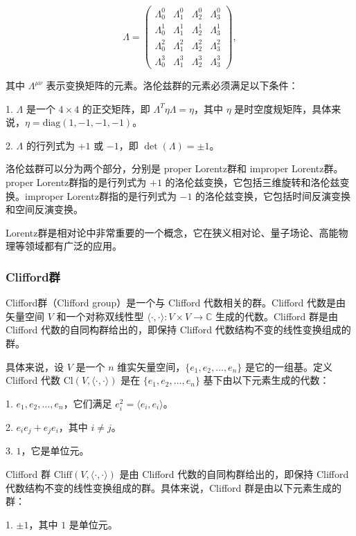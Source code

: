 \documentclass[UTF8,a4paper,11pt]{article}
\begin{document}
$$
\Lambda = \begin{pmatrix} \Lambda^0_0 & \Lambda^0_1 & \Lambda^0_2 & \Lambda^0_3 \\ \Lambda^1_0 & \Lambda^1_1 & \Lambda^1_2 & \Lambda^1_3 \\ \Lambda^2_0 & \Lambda^2_1 & \Lambda^2_2 & \Lambda^2_3 \\ \Lambda^3_0 & \Lambda^3_1 & \Lambda^3_2 & \Lambda^3_3 \end{pmatrix},
$$

其中 $\Lambda^{\mu\nu}$ 表示变换矩阵的元素。洛伦兹群的元素必须满足以下条件：

1. $\Lambda$ 是一个 $4\times4$ 的正交矩阵，即 $\Lambda^T \eta \Lambda = \eta$，其中 $\eta$ 是时空度规矩阵，具体来说，$\eta = \text{diag}(1,-1,-1,-1)$。

2. $\Lambda$ 的行列式为 $+1$ 或 $-1$，即 $\det(\Lambda) = \pm 1$。

洛伦兹群可以分为两个部分，分别是 proper Lorentz群和 improper Lorentz群。proper Lorentz群指的是行列式为 $+1$ 的洛伦兹变换，它包括三维旋转和洛伦兹变换。improper Lorentz群指的是行列式为 $-1$ 的洛伦兹变换，它包括时间反演变换和空间反演变换。

Lorentz群是相对论中非常重要的一个概念，它在狭义相对论、量子场论、高能物理等领域都有广泛的应用。

\subsubsection{Clifford群}
Clifford群（Clifford group）是一个与 Clifford 代数相关的群。Clifford 代数是由矢量空间 $V$ 和一个对称双线性型 $\langle \cdot, \cdot \rangle : V \times V \rightarrow \mathbb{C}$ 生成的代数。Clifford 群是由 Clifford 代数的自同构群给出的，即保持 Clifford 代数结构不变的线性变换组成的群。

具体来说，设 $V$ 是一个 $n$ 维实矢量空间，$\{e_1, e_2, \ldots, e_n\}$ 是它的一组基。定义 Clifford 代数 $\text{Cl}(V,\langle \cdot,\cdot \rangle)$ 是在 $\{e_1, e_2, \ldots, e_n\}$ 基下由以下元素生成的代数：

1. $e_1, e_2, \ldots, e_n$，它们满足 $e_i^2 = \langle e_i, e_i \rangle$。

2. $e_ie_j + e_je_i$，其中 $i \neq j$。

3. $1$，它是单位元。

Clifford 群 $\text{Cliff}(V,\langle \cdot,\cdot \rangle)$ 是由 Clifford 代数的自同构群给出的，即保持 Clifford 代数结构不变的线性变换组成的群。具体来说，Clifford 群是由以下元素生成的群：

1. $\pm 1$，其中 $1$ 是单位元。
\end{document}
